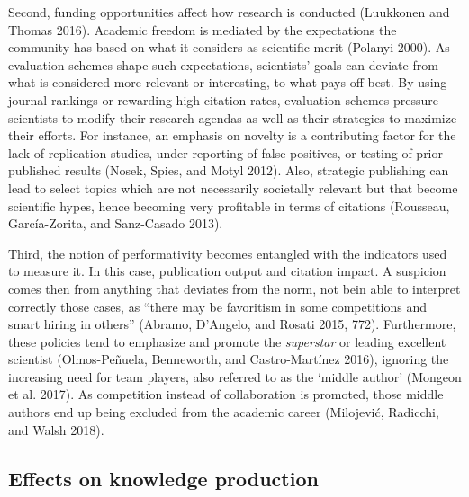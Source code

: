 \documentclass[]{elsarticle} %
\begin{document}
Second, funding opportunities affect how research is conducted
(Luukkonen and Thomas 2016). Academic freedom is mediated by the
expectations the community has based on what it considers as scientific
merit (Polanyi 2000). As evaluation schemes shape such expectations,
scientists' goals can deviate from what is considered more relevant or
interesting, to what pays off best. By using journal rankings or
rewarding high citation rates, evaluation schemes pressure scientists to
modify their research agendas as well as their strategies to maximize
their efforts. For instance, an emphasis on novelty is a contributing
factor for the lack of replication studies, under-reporting of false
positives, or testing of prior published results (Nosek, Spies, and
Motyl 2012). Also, strategic publishing can lead to select topics which
are not necessarily societally relevant but that become scientific
hypes, hence becoming very profitable in terms of citations (Rousseau,
García-Zorita, and Sanz-Casado 2013).

Third, the notion of performativity becomes entangled with the
indicators used to measure it. In this case, publication output and
citation impact. A suspicion comes then from anything that deviates from
the norm, not bein able to interpret correctly those cases, as ``there
may be favoritism in some competitions and smart hiring in others''
(Abramo, D'Angelo, and Rosati 2015, 772). Furthermore, these policies
tend to emphasize and promote the \emph{superstar} or leading excellent
scientist (Olmos-Peñuela, Benneworth, and Castro-Martínez 2016),
ignoring the increasing need for team players, also referred to as the
`middle author' (Mongeon et al. 2017). As competition instead of
collaboration is promoted, those middle authors end up being excluded
from the academic career (Milojević, Radicchi, and Walsh 2018).

\hypertarget{effects-on-knowledge-production}{%
\subsection{Effects on knowledge
production}\label{effects-on-knowledge-production}}
\end{document}
